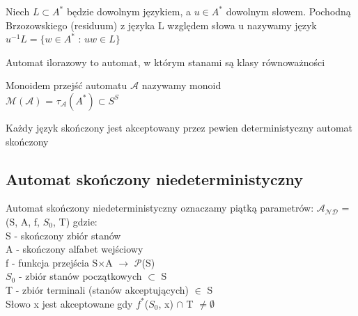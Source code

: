 \documentclass[main.tex]{subfiles}
\begin{document}
    \begin{definition}
        Niech $L \subset  A^{*}$ będzie dowolnym językiem, a $u \in A^{*}$ dowolnym słowem.
        Pochodną Brzozowskiego (residuum) z języka L względem słowa u nazywamy język \\
        $u^{-1}L = \{w \in A^{*}$  :  $uw \in L \}$
    \end{definition}

    \begin{definition}
        Automat ilorazowy to automat, w którym stanami są klasy równoważności
    \end{definition}

    \begin{definition}
        Monoidem przejść automatu $\mathcal{A}$ nazywamy monoid \\
        $\mathcal{M(A)}$ = $\tau_\mathcal{A}(A^*) \subset S^{S}$
    \end{definition}

    \begin{definition}
        Każdy język skończony jest akceptowany przez pewien deterministyczny automat skończony
    \end{definition}

    \subsection{Automat skończony niedeterministyczny}
    \begin{definition}
        Automat skończony niedeterministyczny oznaczamy piątką parametrów: $\mathcal{A_{ND}}$ = (S, A, f, $S_{0}$, T) gdzie: \\
        S - skończony zbiór stanów \\
        A - skończony alfabet wejściowy \\
        f - funkcja przejścia S$\times$A $\rightarrow$ $\mathcal{P}$(S) \\
        $S_{0}$ - zbiór stanów początkowych $\subset$ S\\
        T - zbiór terminali (stanów akceptujących) $\in$ S \\

        Słowo x jest akceptowane gdy $f^{*}$($S_{0}$, x) $\cap$ T $\neq \emptyset$
    \end{definition}
\end{document}
